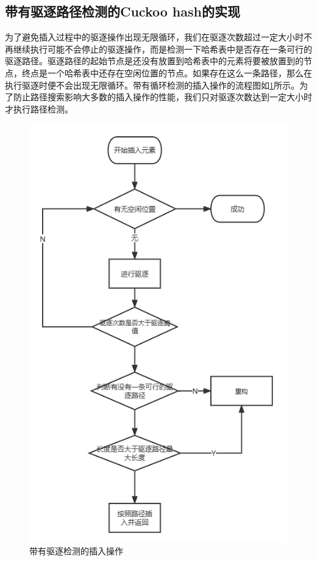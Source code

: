 \documentclass[supercite]{Experimental_Report}
\theoremstyle{definition}
\begin{document}
\subsection{带有驱逐路径检测的Cuckoo hash的实现}

为了避免插入过程中的驱逐操作出现无限循环，我们在驱逐次数超过一定大小时不再继续执行可能不会停止的驱逐操作，而是检测一下哈希表中是否存在一条可行的驱逐路径。驱逐路径的起始节点是还没有放置到哈希表中的元素将要被放置到的节点，终点是一个哈希表中还存在空闲位置的节点。如果存在这么一条路径，那么在执行驱逐时便不会出现无限循环。带有循环检测的插入操作的流程图如\ref{fig3-1}所示。为了防止路径搜索影响大多数的插入操作的性能，我们只对驱逐次数达到一定大小时才执行路径检测。


\begin{figure}[htb]
	\begin{center}
		\includegraphics[scale=0.6]{./images/flow.png}
		\caption{带有驱逐检测的插入操作}
		\label{fig3-1}
	\end{center}
\end{figure}
\end{document}

